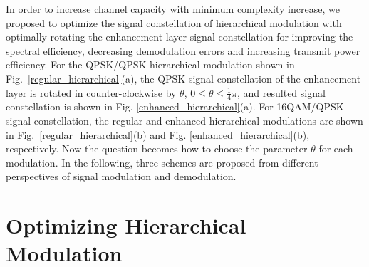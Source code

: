\documentclass[conference]{IEEEtran}
\begin{document}
In order to increase channel capacity with minimum complexity
increase, we proposed to optimize the signal constellation of
hierarchical modulation with optimally rotating the
enhancement-layer signal constellation for improving the spectral
efficiency, decreasing demodulation errors and increasing transmit
power efficiency. For the QPSK/QPSK hierarchical modulation shown
in Fig.~\ref{regular_hierarchical}(a), the QPSK signal
constellation of the enhancement layer is rotated in
counter-clockwise by $\theta$, $0\leq\theta\leq\frac{1}{4}\pi$,
and resulted signal constellation is shown in Fig.
\ref{enhanced_hierarchical}(a). For 16QAM/QPSK signal
constellation, the regular and enhanced hierarchical modulations
are shown in Fig.~\ref{regular_hierarchical}(b) and Fig.
\ref{enhanced_hierarchical}(b), respectively. Now the question
becomes how to choose the parameter $\theta$ for each modulation.
In the following, three schemes are proposed from different
perspectives of signal modulation and demodulation.
\begin{figure}
\end{figure}

\section{Optimizing Hierarchical Modulation}
\end{document}
